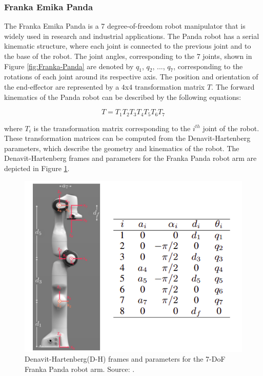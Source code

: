 \subsubsection{Franka Emika Panda}

The Franka Emika Panda is a 7 degree-of-freedom robot manipulator that is widely used in research and industrial applications. The Panda robot has a serial kinematic structure, where each joint is connected to the previous joint and to the base of the robot. The joint angles, corresponding to the 7 joints, shown in Figure \ref{fig:Franka-Panda} are denoted by $q_1$, $q_2$, ..., $q_7$, corresponding to the rotations of each joint around its respective axis. The position and orientation of the end-effector are represented by a $4$x$4$ transformation matrix $T$. The forward kinematics of the Panda robot can be described by the following equations:

\begin{equation}
    T = T_1T_2T_3T_4T_5T_6T_7
    \label{eqn: fk_manipulator}
\end{equation}


where $T_i$ is the transformation matrix corresponding to the $i^{th}$ joint of the robot. These transformation matrices can be computed from the Denavit-Hartenberg parameters, which describe the geometry and kinematics of the robot. The Denavit-Hartenberg frames and parameters for the Franka Panda robot arm are depicted in Figure \ref{fig:dh-franka}.

\begin{figure}[ht]
    \centering
    \includegraphics[scale=0.5]{figures/background/dh-franka.png}
    \caption[DH Parameters for the Franka Panda Arm]{Denavit-Hartenberg(D-H) frames and parameters for the 7-DoF Franka Panda robot arm. Source: \cite{DH-Franka}.}
    \label{fig:dh-franka}
\end{figure}

